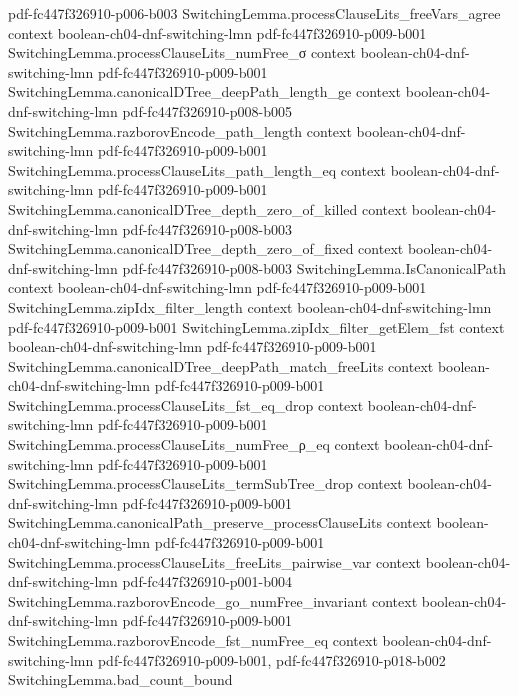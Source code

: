 \begin{theorem}
  {pdf-fc447f326910-p006-b003}
\proofstep
  {SwitchingLemma.processClauseLits_freeVars_agree}
  {context}
  {boolean-ch04-dnf-switching-lmn}
  {pdf-fc447f326910-p009-b001}
\proofstep
  {SwitchingLemma.processClauseLits_numFree_σ}
  {context}
  {boolean-ch04-dnf-switching-lmn}
  {pdf-fc447f326910-p009-b001}
\proofstep
  {SwitchingLemma.canonicalDTree_deepPath_length_ge}
  {context}
  {boolean-ch04-dnf-switching-lmn}
  {pdf-fc447f326910-p008-b005}
\proofstep
  {SwitchingLemma.razborovEncode_path_length}
  {context}
  {boolean-ch04-dnf-switching-lmn}
  {pdf-fc447f326910-p009-b001}
\proofstep
  {SwitchingLemma.processClauseLits_path_length_eq}
  {context}
  {boolean-ch04-dnf-switching-lmn}
  {pdf-fc447f326910-p009-b001}
\proofstep
  {SwitchingLemma.canonicalDTree_depth_zero_of_killed}
  {context}
  {boolean-ch04-dnf-switching-lmn}
  {pdf-fc447f326910-p008-b003}
\proofstep
  {SwitchingLemma.canonicalDTree_depth_zero_of_fixed}
  {context}
  {boolean-ch04-dnf-switching-lmn}
  {pdf-fc447f326910-p008-b003}
\proofstep
  {SwitchingLemma.IsCanonicalPath}
  {context}
  {boolean-ch04-dnf-switching-lmn}
  {pdf-fc447f326910-p009-b001}
\proofstep
  {SwitchingLemma.zipIdx_filter_length}
  {context}
  {boolean-ch04-dnf-switching-lmn}
  {pdf-fc447f326910-p009-b001}
\proofstep
  {SwitchingLemma.zipIdx_filter_getElem_fst}
  {context}
  {boolean-ch04-dnf-switching-lmn}
  {pdf-fc447f326910-p009-b001}
\proofstep
  {SwitchingLemma.canonicalDTree_deepPath_match_freeLits}
  {context}
  {boolean-ch04-dnf-switching-lmn}
  {pdf-fc447f326910-p009-b001}
\proofstep
  {SwitchingLemma.processClauseLits_fst_eq_drop}
  {context}
  {boolean-ch04-dnf-switching-lmn}
  {pdf-fc447f326910-p009-b001}
\proofstep
  {SwitchingLemma.processClauseLits_numFree_ρ_eq}
  {context}
  {boolean-ch04-dnf-switching-lmn}
  {pdf-fc447f326910-p009-b001}
\proofstep
  {SwitchingLemma.processClauseLits_termSubTree_drop}
  {context}
  {boolean-ch04-dnf-switching-lmn}
  {pdf-fc447f326910-p009-b001}
\proofstep
  {SwitchingLemma.canonicalPath_preserve_processClauseLits}
  {context}
  {boolean-ch04-dnf-switching-lmn}
  {pdf-fc447f326910-p009-b001}
\proofstep
  {SwitchingLemma.processClauseLits_freeLits_pairwise_var}
  {context}
  {boolean-ch04-dnf-switching-lmn}
  {pdf-fc447f326910-p001-b004}
\proofstep
  {SwitchingLemma.razborovEncode_go_numFree_invariant}
  {context}
  {boolean-ch04-dnf-switching-lmn}
  {pdf-fc447f326910-p009-b001}
\proofstep
  {SwitchingLemma.razborovEncode_fst_numFree_eq}
  {context}
  {boolean-ch04-dnf-switching-lmn}
  {pdf-fc447f326910-p009-b001,
    pdf-fc447f326910-p018-b002}
\proofstep
  {SwitchingLemma.bad_count_bound}

\end{theorem}
